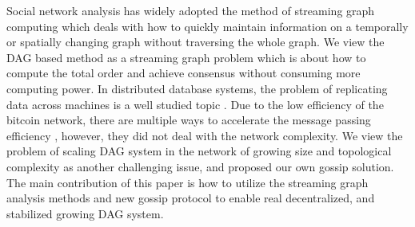 Social network analysis has widely adopted the method of streaming graph computing \cite{ediger2011tracking, green2012fast, ediger2012stinger} which deals
with how to quickly maintain information on a temporally or spatially changing graph without traversing the whole graph. 
We view the DAG based method as a streaming graph problem which is about how to compute the total order and achieve consensus without consuming more computing power.
In distributed database systems, the problem of replicating data across machines is a well studied topic \cite{demers1988epidemic}.
Due to the low efficiency of the bitcoin network, there are multiple ways to accelerate the message passing efficiency \cite{klarmanbloxroute}, however, they did not deal with the network complexity. 
We view the problem of scaling DAG system in the network of growing size and topological complexity as another challenging issue, and proposed our own gossip solution.
The main contribution of this paper is how to utilize the streaming graph analysis methods and new gossip protocol to enable real decentralized, and stabilized growing DAG system.
